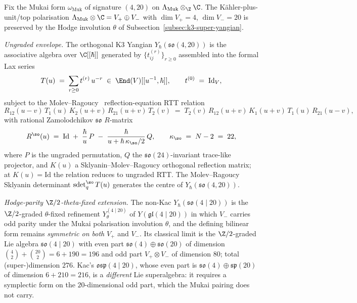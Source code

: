 \begin{definition}
\label{def:osp-super-yangian-K3}
Fix the Mukai form $\omega_{\mathrm{Muk}}$ of signature $(4, 20)$ on
$\Lambda_{\mathrm{Muk}} \otimes_\Z \C$. The K\"ahler-plus-unit/top
polarisation $\Lambda_{\mathrm{Muk}} \otimes \C = V_+ \oplus V_-$
with $\dim V_+ = 4$, $\dim V_- = 20$ is preserved by the Hodge
involution $\theta$ of
Subsection~\ref{subsec:k3-super-yangian}.

\emph{Ungraded envelope.} The orthogonal K$3$ Yangian
$Y_\hbar(\mathfrak{so}(4, 20))$ is the associative algebra over
$\C[[\hbar]]$ generated by $\{t_{ij}^{(r)}\}_{r \geq 0}$ assembled
into the formal Lax series
\[
 T(u) \;=\; \sum_{r \geq 0} t^{(r)}\, u^{-r}
 \;\in\; \End(V)[[u^{-1}, \hbar]], \qquad t^{(0)} \;=\; \mathrm{Id}_V,
\]
subject to the Molev--Ragoucy~\cite{MolevRagoucy2008}
reflection-equation RTT relation
\[
 R_{12}(u - v)\, T_1(u)\, K_2(u + v)\, R_{21}(u + v)\, T_2(v)
 \;=\;
 T_2(v)\, R_{12}(u + v)\, K_1(u + v)\, T_1(u)\, R_{21}(u - v),
\]
with rational Zamolodchikov $\mathfrak{so}$ $R$-matrix
\[
 R^{\so}(u) \;=\; \mathrm{Id}
 \;+\; \frac{\hbar}{u}\, P
 \;-\; \frac{\hbar}{u + \hbar\, \kappa_{\so}/2}\, Q,
 \qquad
 \kappa_{\so} \;=\; N - 2 \;=\; 22,
\]
where $P$ is the ungraded permutation, $Q$ the
$\mathfrak{so}(24)$-invariant trace-like projector, and $K(u)$ a
Sklyanin--Molev--Ragoucy orthogonal reflection matrix; at
$K(u) = \mathrm{Id}$ the relation reduces to ungraded RTT. The
Molev--Ragoucy Sklyanin determinant $\operatorname{sdet}^{\so}_q T(u)$
generates the centre of $Y_\hbar(\mathfrak{so}(4, 20))$.

\emph{Hodge-parity $\Z/2$-theta-fixed extension.} The non-Kac
$Y_\hbar(\mathfrak{so}(4 \mid 20))$ is the $\Z/2$-graded
$\theta$-fixed refinement $Y_\theta^{(4\mid20)}$ of
$Y(\mathfrak{gl}(4 \mid 20))$ in which $V_-$ carries odd parity
under the Mukai polarisation involution $\theta$, and the defining bilinear form
remains \emph{symmetric on both} $V_+$ and $V_-$. Its classical
limit is the $\Z/2$-graded Lie algebra $\mathfrak{so}(4 \mid 20)$
with even part $\mathfrak{so}(4) \oplus \mathfrak{so}(20)$ of
dimension $\binom{4}{2} + \binom{20}{2} = 6 + 190 = 196$ and odd
part $V_+ \otimes V_-$ of dimension $80$; total (super-)dimension
$276$. Kac's $\mathfrak{osp}(4 \mid 20)$, whose even part is
$\mathfrak{so}(4) \oplus \mathfrak{sp}(20)$ of dimension
$6 + 210 = 216$, is a \emph{different} Lie superalgebra: it requires
a symplectic form on the $20$-dimensional odd part, which the Mukai
pairing does not carry.


\end{definition}
